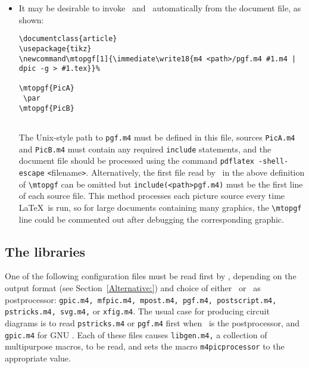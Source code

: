 \begin{itemize}
\par
\verb|\newcommand{\diaA}{%|\NVL
\verb|.PS|\NVL
{\sl drawing commands}\NVL
\verb|.PE|\NVL
\verb|\box\graph }%  \box\graph not required for dpic|\NVL
\verb|\newcommand{\diaB}{%|\NVL
\verb|.PS|\NVL
{\sl drawing commands}\NVL
\verb|.PE|\NVL
\verb|\box\graph }%  \box\graph not required for dpic|\NVL
\noindent Process the file using \Mfour\ and \dpic\ or \gpic\ to produce
a {\tt.tex} file, insert this into the \LaTeX\ source using \verb||, and 
invoke the macros at the appropriate places.

\item
It may be desirable to invoke \Mfour\ and \dpic\ automatically from the
document file, as shown:
\begin{verbatim}
\documentclass{article}
\usepackage{tikz}
\newcommand\mtopgf[1]{\immediate\write18{m4 <path>/pgf.m4 #1.m4 | dpic -g > #1.tex}}%
 
\mtopgf{PicA}
 \par
\mtopgf{PicB}


\end{verbatim}

The Unix-style path to \verb|pgf.m4| must be defined in this file,
sources \verb|PicA.m4| and \verb|PicB.m4| must contain any required
\verb|include| statements,
and the document file should be processed using
the command \verb|pdflatex -shell-escape| {\tt<}filename{\tt>}.
Alternatively, the first file read by \Mfour\ in the above definition
of \verb|\mtopgf| can be omitted but \verb|include(<path>pgf.m4)|
must be the first line of each source file.
This method processes each picture source every time \LaTeX\ is run, so for
large documents containing many graphics, the \verb|\mtopgf|
line could be commented out after debugging the corresponding graphic.
\end{itemize}

\subsection{The libraries}\label{Libraries}
One of the following configuration files must be read first by \Mfour,
depending on the output format (see Section~\ref{Alternative:}) and choice
of either \dpic\ or \gpic\ as postprocessor:
{\tt gpic.m4, mfpic.m4, mpost.m4, pgf.m4, postscript.m4, pstricks.m4, svg.m4,}
or {\tt xfig.m4}. The usual case for producing circuit diagrams is to read
{\tt pstricks.m4} or {\tt pgf.m4} first when \dpic\ is the postprocessor, and
{\tt gpic.m4} for GNU \pic.
Each of these files causes {\tt libgen.m4,} a collection of
multipurpose macros, to be read, and sets the macro
{\tt m4picprocessor} to the appropriate value.


